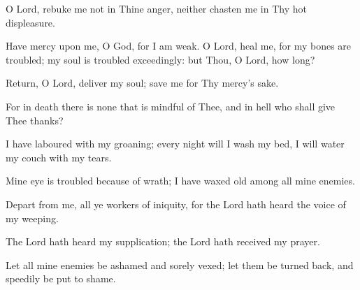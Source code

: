 O Lord, rebuke me not in Thine anger, neither chasten me in Thy hot displeasure.

Have mercy upon me, O God, for I am weak. O Lord, heal me, for my bones are troubled; my soul is troubled exceedingly: but Thou, O Lord, how long?

Return, O Lord, deliver my soul; save me for Thy mercy's sake.

For in death there is none that is mindful of Thee, and in hell who shall give Thee thanks?

I have laboured with my groaning; every night will I wash my bed, I will water my couch with my tears.

Mine eye is troubled because of wrath; I have waxed old among all mine enemies.

Depart from me, all ye workers of iniquity, for the Lord hath heard the voice of my weeping.

The Lord hath heard my supplication; the Lord hath received my prayer.

Let all mine enemies be ashamed and sorely vexed; let them be turned back, and speedily be put to shame.
